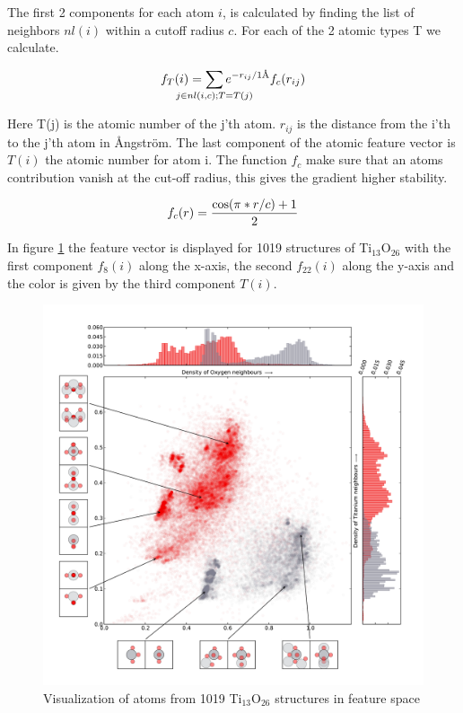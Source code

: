 \documentclass[%
 aps,
 prl,%
 amsmath,amssymb,
 reprint,%
]{revtex4-1}
\begin{document}
The first 2 components for each atom $i$, is calculated by finding the list of neighbors $nl(i)$ within a cutoff radius $c$. For each of the 2 atomic types T we calculate. 

\begin{equation}
f_T(i) = \sum_{\mathclap{j \in nl(i,c);T=T(j)}} e^{-r_{ij}/1\text{\AA}}f_c(r_{ij})  \label{eq1}
\end{equation}

Here T(j) is the atomic number of the j'th atom. $r_{ij}$ is the distance from the i'th to the j'th atom in {\AA}ngstr\"{o}m. The last component of the atomic feature vector is $T(i)$ the atomic number for atom i. 
The function $f_c$ make sure that an atoms contribution vanish at the cut-off radius, this gives the gradient higher stability.

\begin{equation}
f_c(r)={{\cos(\pi*r/c)+1}\over 2}
\end{equation}



In figure \ref{fig1} the feature vector is displayed for 1019 structures of Ti$_{13}$O$_{26}$ with the first component $f_8(i)$ along the x-axis, the second $f_{22}(i)$ along the y-axis and the color is given by the third component $T(i)$. 


\begin{figure}[h]
    \centering
    \includegraphics[width=1.0\columnwidth]{fig1-scatterplot.pdf}
    \caption{Visualization of atoms from 1019 Ti$_{13}$O$_{26}$ structures in feature space}
    \label{fig1}
\end{figure}
\end{document}
